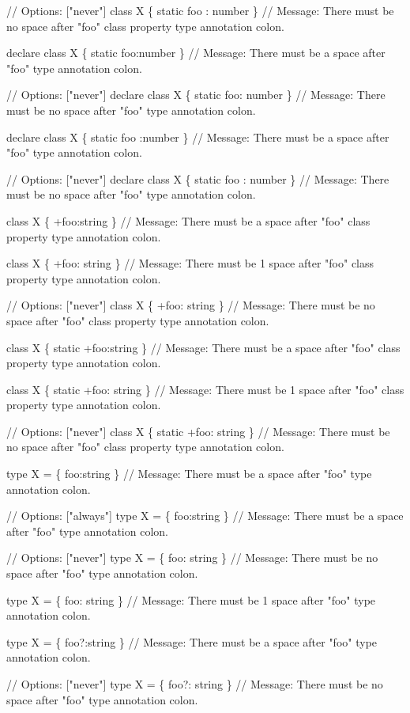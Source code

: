 \begin{DoxyCode}
// Options: ["never"]
class X \{ static foo : number \}
// Message: There must be no space after "foo" class property type annotation colon.

declare class X \{ static foo:number \}
// Message: There must be a space after "foo" type annotation colon.

// Options: ["never"]
declare class X \{ static foo: number \}
// Message: There must be no space after "foo" type annotation colon.

declare class X \{ static foo :number \}
// Message: There must be a space after "foo" type annotation colon.

// Options: ["never"]
declare class X \{ static foo : number \}
// Message: There must be no space after "foo" type annotation colon.

class X \{ +foo:string \}
// Message: There must be a space after "foo" class property type annotation colon.

class X \{ +foo:  string \}
// Message: There must be 1 space after "foo" class property type annotation colon.

// Options: ["never"]
class X \{ +foo: string \}
// Message: There must be no space after "foo" class property type annotation colon.

class X \{ static +foo:string \}
// Message: There must be a space after "foo" class property type annotation colon.

class X \{ static +foo:  string \}
// Message: There must be 1 space after "foo" class property type annotation colon.

// Options: ["never"]
class X \{ static +foo: string \}
// Message: There must be no space after "foo" class property type annotation colon.

type X = \{ foo:string \}
// Message: There must be a space after "foo" type annotation colon.

// Options: ["always"]
type X = \{ foo:string \}
// Message: There must be a space after "foo" type annotation colon.

// Options: ["never"]
type X = \{ foo: string \}
// Message: There must be no space after "foo" type annotation colon.

type X = \{ foo:  string \}
// Message: There must be 1 space after "foo" type annotation colon.

type X = \{ foo?:string \}
// Message: There must be a space after "foo" type annotation colon.

// Options: ["never"]
type X = \{ foo?: string \}
// Message: There must be no space after "foo" type annotation colon.


\end{DoxyCode}
